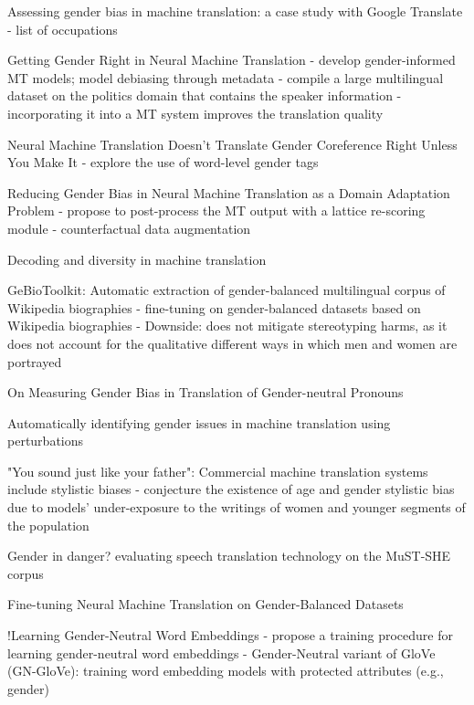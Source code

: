 Assessing gender bias in machine translation: a case study with Google Translate \parencite{Prates_2019}
- list of occupations

Getting Gender Right in Neural Machine Translation \parencite{Vanmassenhove_2018}
- develop gender-informed MT models; model debiasing through metadata
- compile a large multilingual dataset on the politics domain that contains the speaker information
- incorporating it into a MT system improves the translation quality

Neural Machine Translation Doesn't Translate Gender Coreference Right Unless You Make It \parencite{Saunders_2020_coreference}
- explore the use of word-level gender tags

Reducing Gender Bias in Neural Machine Translation as a Domain Adaptation Problem \parencite{Saunders_2020}
- propose to post-process the MT output with a lattice re-scoring module
- counterfactual data augmentation
 
Decoding and diversity in machine translation \parencite{roberts2020decoding}

GeBioToolkit: Automatic extraction of gender-balanced multilingual corpus of Wikipedia biographies \parencite{costa2019gebiotoolkit}
- fine-tuning on gender-balanced datasets based on Wikipedia biographies
- Downside: does not mitigate stereotyping harms, as it does not account for the qualitative different ways in which men and women are portrayed

On Measuring Gender Bias in Translation of Gender-neutral Pronouns \parencite{Cho_2019}

Automatically identifying gender issues in machine translation using perturbations \parencite{Gonen_2020}

"You sound just like your father": Commercial machine translation systems include stylistic biases \parencite{Hovy_2020}
- conjecture the existence of age and gender stylistic bias due to models’ under-exposure to the writings of women and younger segments of the population

Gender in danger? evaluating speech translation technology on the MuST-SHE corpus \parencite{MuST-SHE}

Fine-tuning Neural Machine Translation on Gender-Balanced Datasets \parencite{costa2020fine}


!Learning Gender-Neutral Word Embeddings \parencite{Zhao_2018_GN-GloVe}
- propose a training procedure for learning gender-neutral word embeddings
- Gender-Neutral variant of GloVe (GN-GloVe): training word embedding models with protected attributes (e.g., gender)

